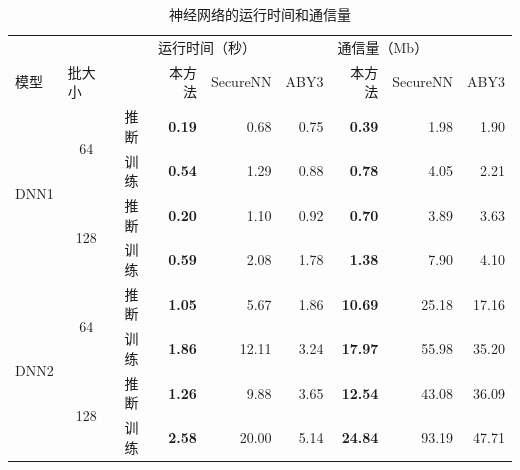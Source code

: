 \begin{table}[h!]
\caption{神经网络的运行时间和通信量}
\label{tab:ss-perm:dnn}
\renewcommand{\arraystretch}{0.8}
\centering
\begin{tabular}{@{}cccrrrrrr@{}}
    \toprule
    \multicolumn{1}{l}{}  & \multicolumn{1}{l}{} &    & \multicolumn{2}{l}{运行时间（秒）} &      & \multicolumn{2}{l}{通信量（Mb）} &       \\ \cmidrule(lr){4-6}\cmidrule(lr){7-9}
    \multicolumn{1}{l}{模型} & \multicolumn{1}{l}{批大小} &    & 本方法           & SecureNN & \phantom{12}ABY3 & 本方法            & SecureNN & \phantom{12}ABY3           \\ \cmidrule(lr){1-3}\cmidrule(lr){4-6}\cmidrule(lr){7-9}
    \multirow{4}{*}{DNN1} & \multirow{2}{*}{64}  & 推断 & \textbf{0.19}     & 0.68    & 0.75 & \textbf{0.39}     & 1.98    & 1.90  \\ \cmidrule(l){3-3}\cmidrule(lr){4-6}\cmidrule(lr){7-9}
                            &                         & 训练 & \textbf{0.54} & 1.29     & 0.88 & \textbf{0.78}  & 4.05     & 2.21  \\ \cmidrule(l){2-3}\cmidrule(lr){4-6}\cmidrule(lr){7-9}
                            & \multirow{2}{*}{128}    & 推断 & \textbf{0.20} & 1.10     & 0.92 & \textbf{0.70}  & 3.89     & 3.63  \\ \cmidrule(l){3-3}\cmidrule(lr){4-6}\cmidrule(lr){7-9}
                            &                         & 训练 & \textbf{0.59} & 2.08     & 1.78 & \textbf{1.38}  & 7.90     & 4.10  \\ \midrule
    \multirow{4}{*}{DNN2} & \multirow{2}{*}{64}  & 推断 & \textbf{1.05}     & 5.67    & 1.86 & \textbf{10.69}    & 25.18   & 17.16 \\ \cmidrule(l){3-3}\cmidrule(lr){4-6}\cmidrule(lr){7-9}
                            &                         & 训练 & \textbf{1.86} & 12.11    & 3.24 & \textbf{17.97} & 55.98    & 35.20 \\ \cmidrule(l){2-3}\cmidrule(lr){4-6}\cmidrule(lr){7-9}
                            & \multirow{2}{*}{128}    & 推断 & \textbf{1.26} & 9.88     & 3.65 & \textbf{12.54} & 43.08    & 36.09 \\ \cmidrule(l){3-3}\cmidrule(lr){4-6}\cmidrule(lr){7-9}
                            &                         & 训练 & \textbf{2.58} & 20.00    & 5.14 & \textbf{24.84} & 93.19    & 47.71 \\ \bottomrule
\end{tabular}
\end{table}


